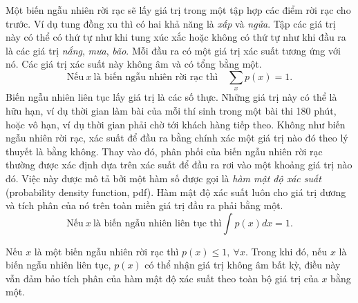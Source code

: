 Một biến ngẫu nhiên rời rạc sẽ lấy giá trị trong một tập hợp các điểm rời rạc
cho trước. Ví dụ tung đồng xu thì có hai khả năng là \textit{xấp} và
\textit{ngửa}. Tập các giá trị này có thể có thứ tự như khi tung xúc xắc hoặc
không có thứ tự như khi đầu ra là các giá trị \textit{nắng}, \textit{mưa},
\textit{bão}. Mỗi đầu ra có một giá trị xác suất tương ứng với nó. Các giá trị
xác suất này không âm và có tổng bằng một.
\begin{equation}
\label{eqn:30_1}
\text{Nếu}~ x ~\text{là biến ngẫu nhiên rời rạc thì}\quad \sum_{x} p(x) = 1.
\end{equation}
Biến ngẫu nhiên liên tục lấy giá trị là các số thực. Những giá trị này có thể là
hữu hạn, ví dụ thời gian làm bài của mỗi thí sinh trong một bài thi 180 phút,
hoặc vô hạn, ví dụ thời gian phải chờ tới khách hàng tiếp theo. Không như biến
ngẫu nhiên rời rạc, xác suất để đầu ra bằng {chính xác} một giá trị nào đó theo
lý thuyết là bằng không. Thay vào đó, phân phối của biến ngẫu nhiên rời rạc
thường được xác định dựa trên xác suất để đầu ra rơi vào một khoảng giá trị nào
đó. Việc này được mô tả bởi một hàm số được gọi là \textit{hàm mật độ xác suất} (probability density function, pdf). Hàm mật độ xác suất
luôn cho giá trị dương và tích phân của nó trên toàn miền giá trị đầu ra phải
bằng một.
\begin{equation}
\label{eqn:30_2}
\text{Nếu}~ x ~\text{là biến ngẫu nhiên liên tục thì} \int p(x)dx = 1.
\end{equation}

\begin{mynote}
Nếu $x$ là một biến ngẫu nhiên rời rạc thì $p(x) \leq 1,~\forall x$. Trong khi
đó, nếu $x$ là biến ngẫu nhiên liên tục, $p(x)$ có thể nhận giá trị không âm
bất kỳ, điều này vẫn đảm bảo tích phân của hàm mật độ xác suất theo toàn
bộ giá trị của $x$ bằng một.    %
\end{mynote}


